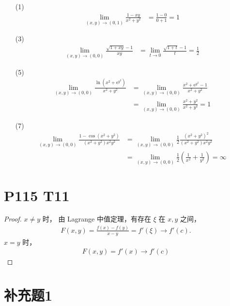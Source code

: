 \documentclass{article}
\begin{document}
\begin{itemize}
    \item [(1)]
    \begin{align*}
        \lim_{(x, y) \to (0, 1)}\frac{1 - xy}{x^2 + y^2} &= \frac{1 - 0}{0 + 1} = 1
    \end{align*}
    \item [(3)]
    \begin{align*}
        \lim_{(x, y) \to (0, 0)} \frac{\sqrt{1 + xy} - 1}{xy} &= \lim_{t \to 0}\frac{\sqrt{1 + t} - 1}{t} = \frac{1}{2}
    \end{align*}
    \item [(5)]
    \begin{align*}
        \lim_{(x, y) \to (0, 0)}\frac{\ln \left(x^2 + \mathrm{e}^{y^2}\right)}{x^2 + y^2} &= \lim_{(x, y) \to (0, 0)}\frac{x^2 + \mathrm{e}^{y^2} - 1}{x^2 + y^2} \\
        &= \lim_{(x, y) \to (0, 0)} \frac{x^2 + y^2}{x^2 + y^2} = 1
    \end{align*}
    \item [(7)]
    \begin{align*}
        \lim_{(x, y) \to (0, 0)} \frac{1 - \cos (x^2 + y^2)}{(x^2 + y^2)x^2 y^2} &= \lim_{(x, y) \to (0, 0)}\frac{1}{2}\frac{(x^2 + y^2)^2}{(x^2 + y^2)x^2 y^2} \\
        &= \lim_{(x, y) \to (0, 0)}\frac{1}{2}\left(\frac{1}{x^2 } + \frac{1}{y^2}\right) = \infty
    \end{align*}
\end{itemize}

\section*{P115 T11}

\begin{proof}
    $x \neq y$ 时，
    由 Lagrange 中值定理，有存在 $\xi$ 在 $x, y$ 之间，
    \begin{align*}
        F(x, y) = \frac{f(x) - f(y)}{x - y} = f'(\xi) \to f'(c).
    \end{align*}
    $x = y$ 时，
    \begin{align*}
        F(x, y) = f'(x) \to f'(c)
    \end{align*}
\end{proof}

\section*{补充题1}
\end{document}
